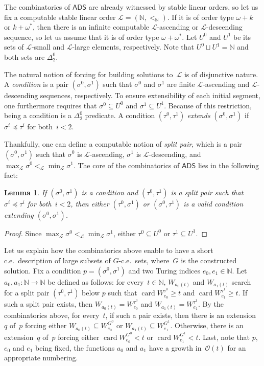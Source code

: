 \documentclass{article}
\def\L{\mathcal{L}}
\newcommand{\ADS}[0]{\mathsf{ADS}}
\newcommand{\NN}[0]{\mathbb{N}}
\newcommand{\card}{\operatorname{card}}
\numberwithin{theorem}{section}
\newtheorem{lemma}[theorem]{Lemma}
\begin{document}
The combinatorics of $\ADS$ are already witnessed by stable linear orders, so let us fix a computable stable linear order $\L = (\NN, <_\NN)$. If it is of order type $\omega+k$ or $k+\omega^*$, then there is an infinite computable $\L$-ascending or $\L$-descending sequence, so let us assume that it is of order type $\omega+\omega^*$. Let $U^0$ and $U^1$ be its sets of $\L$-small and $\L$-large elements, respectively. Note that $U^0 \sqcup U^1 = \NN$ and both sets are $\Delta^0_2$.

The natural notion of forcing for building solutions to~$\L$ is of disjunctive nature. A \emph{condition} is a pair $(\sigma^0, \sigma^1)$ such that $\sigma^0$ and $\sigma^1$ are finite $\L$-ascending and $\L$-descending sequences, respectively. To ensure extensibility of each initial segment, one furthermore requires that $\sigma^0 \subseteq U^0$ and $\sigma^1 \subseteq U^1$. Because of this restriction, being a condition is a $\Delta^0_2$ predicate. A condition $(\tau^0, \tau^1)$ \emph{extends} $(\sigma^0, \sigma^1)$ if $\sigma^i \preceq \tau^i$ for both~$i < 2$.

Thankfully, one can define a computable notion of \emph{split pair}, which is a pair $(\sigma^0, \sigma^1)$ such that $\sigma^0$ is $\L$-ascending, $\sigma^1$ is $\L$-descending, and $\max_\L \sigma^0 <_\L \min_\L \sigma^1$. The core of the combinatorics of $\ADS$ lies in the following fact:

\begin{lemma}
If $(\sigma^0, \sigma^1)$ is a condition and $(\tau^0, \tau^1)$ is a split pair such that $\sigma^i \preceq \tau^i$ for both~$i < 2$, then either $(\tau^0, \sigma^1)$ or $(\sigma^0, \tau^1)$ is a valid condition extending $(\sigma^0, \sigma^1)$.
\end{lemma}
\begin{proof}
Since $\max_\L \sigma^0 <_\L \min_\L \sigma^1$, either $\tau^0 \subseteq U^0$ or $\tau^1 \subseteq U^1$.
\end{proof}

Let us explain how the combinatorics above enable to have a short c.e.\ description of large subsets of $G$-c.e.\ sets, where~$G$ is the constructed solution. Fix a condition $p = (\sigma^0, \sigma^1)$ and two Turing indices $e_0, e_1 \in \NN$. Let $a_0, a_1 : \NN \to \NN$ be defined as follows: for every~$t \in \NN$, $W_{a_0(t)}$ and $W_{a_1(t)}$ search for a split pair $(\tau^0, \tau^1)$ below $p$ such that $\card W^{\tau^0}_{e_0} \geq t$ and $\card W^{\tau^1}_{e_1} \geq t$. If such a split pair exists, then $W_{a_0(t)} = W^{\tau^0}_{e_0}$ and $W_{a_1(t)} = W^{\tau^1}_{e_1}$. 
By the combinatorics above, for every~$t$, if such a pair exists, then there is an extension~$q$ of~$p$ forcing either $W_{a_0(t)} \subseteq W^{G^0}_{e_0}$ or $W_{a_1(t)} \subseteq W^{G^1}_{e_1}$. Otherwise, there is an extension~$q$ of~$p$ forcing either $\card W^{G^0}_{e_0} < t$ or $\card W^{G^1}_{e_1} < t$. Last, note that $p$, $e_0$ and $e_1$ being fixed, the functions $a_0$ and $a_1$ have a growth in~$\mathcal{O}(t)$ for an appropriate numbering.
\end{document}
